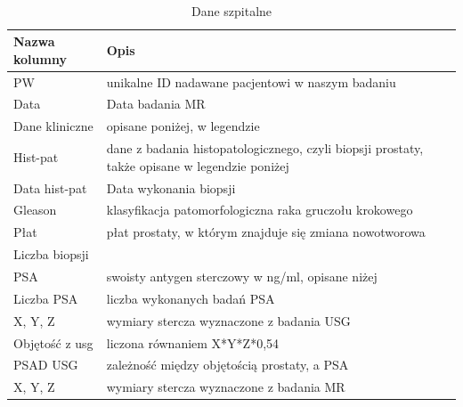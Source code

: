 \documentclass[a4paper,11pt,twoside]{report}
\theoremstyle{definition}
\begin{document}
\\
\begin{table}[h!]
\caption{Dane szpitalne}
\centering
\begin{tabular}{|l|p{10cm}|} \hline 
Nazwa kolumny & Opis \\ \hline 
PW & unikalne ID nadawane pacjentowi w naszym badaniu                                                             \\ \hline 
Data & Data badania MR                                                                                              \\ \hline 
Dane kliniczne & opisane poniżej, w legendzie                                                                       \\ \hline 
Hist-pat & dane z badania histopatologicznego, czyli biopsji prostaty, także opisane w legendzie poniżej            \\ \hline 
Data hist-pat & Data wykonania biopsji                                                                              \\ \hline 
Gleason & klasyfikacja patomorfologiczna raka gruczołu krokowego                                                    \\ \hline 
Płat & płat prostaty, w którym znajduje się zmiana nowotworowa                                                      \\ \hline 
Liczba biopsji                                                                                                       \\ \hline 
PSA & swoisty antygen sterczowy w ng/ml, opisane niżej                                                              \\ \hline 
Liczba PSA & liczba wykonanych badań PSA                                                                            \\ \hline 
X, Y, Z & wymiary stercza wyznaczone z badania USG                                                                  \\ \hline 
Objętość z usg & liczona równaniem X*Y*Z*0,54                                                                     \\ \hline 
PSAD USG & zależność między objętością prostaty, a PSA                                                              \\ \hline 
X, Y, Z & wymiary stercza wyznaczone z badania MR                                                                   \\ \hline 

\end{tabular}
\end{table}
\end{document}
